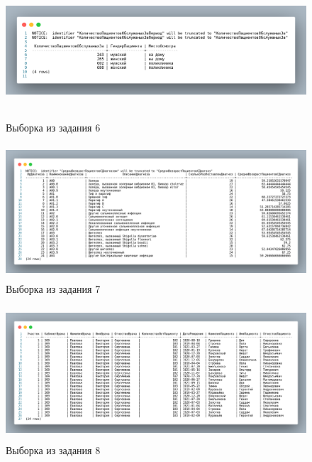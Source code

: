 \begin{figure}[p!h]
  \centering

  \includegraphics[height=5cm]
  {../sql/select/6-out.png}

  \caption{Выборка из задания 6}

  \label{fig:t6}
\end{figure}

\begin{figure}[p!h]
  \centering

  \includegraphics[height=5cm]
  {../sql/select/7-out.png}

  \caption{Выборка из задания 7}

  \label{fig:t7}
\end{figure}

\begin{figure}[p!h]
  \centering

  \includegraphics[height=5cm]
  {../sql/select/8-out.png}

  \caption{Выборка из задания 8}

  \label{fig:t8}
\end{figure}

